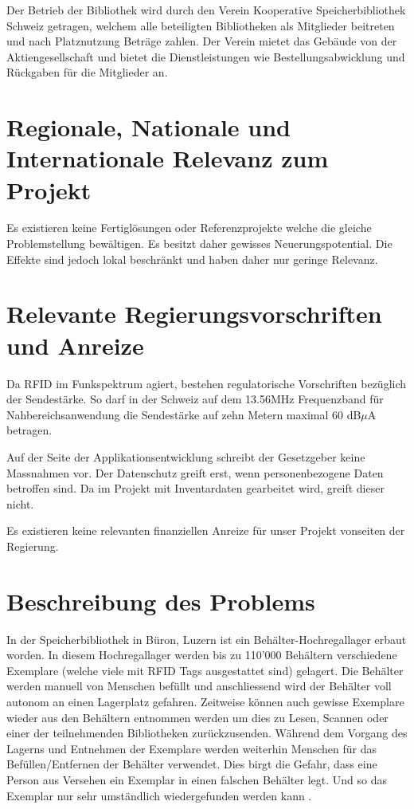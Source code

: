 Der Betrieb der Bibliothek wird durch den Verein Kooperative Speicherbibliothek Schweiz getragen, welchem alle beteiligten Bibliotheken als Mitglieder beitreten und nach Platznutzung Beträge zahlen. Der Verein mietet das Gebäude von der Aktiengesellschaft und bietet die Dienstleistungen wie Bestellungsabwicklung und Rückgaben für die Mitglieder an.

\section{Regionale, Nationale und Internationale Relevanz zum Projekt}
Es existieren keine Fertiglösungen oder Referenzprojekte welche die gleiche Problemstellung bewältigen. Es besitzt daher gewisses Neuerungspotential. Die Effekte sind jedoch lokal beschränkt und haben daher nur geringe Relevanz.

\section{Relevante Regierungsvorschriften und Anreize}
Da RFID im Funkspektrum agiert, bestehen regulatorische Vorschriften bezüglich der Sendestärke. So darf in der Schweiz auf dem 13.56MHz Frequenzband für Nahbereichsanwendung die Sendestärke auf zehn Metern maximal 60 dB$\mu$A betragen.

Auf der Seite der Applikationsentwicklung schreibt der Gesetzgeber keine Massnahmen vor. Der Datenschutz greift erst, wenn personenbezogene Daten betroffen sind. Da im Projekt mit Inventardaten gearbeitet wird, greift dieser nicht.

Es existieren keine relevanten finanziellen Anreize für unser Projekt vonseiten der Regierung.

\section{Beschreibung des Problems}
In der Speicherbibliothek in Büron, Luzern ist ein Behälter-Hochregallager erbaut worden. In diesem Hochregallager werden bis zu 110'000 Behältern verschiedene Exemplare (welche viele mit RFID Tags ausgestattet sind) gelagert. Die Behälter werden manuell von Menschen befüllt und anschliessend wird der Behälter voll autonom an einen Lagerplatz gefahren. Zeitweise können auch gewisse Exemplare wieder aus den Behältern entnommen werden um dies zu Lesen, Scannen oder einer der teilnehmenden Bibliotheken zurückzusenden. Während dem Vorgang des Lagerns und Entnehmen der Exemplare werden weiterhin Menschen für das Befüllen/Entfernen der Behälter verwendet. Dies birgt die Gefahr, dass eine Person aus Versehen ein Exemplar in einen falschen Behälter legt. Und so das Exemplar nur sehr umständlich wiedergefunden werden kann \parencite{HochschuleLuzern2019}.

